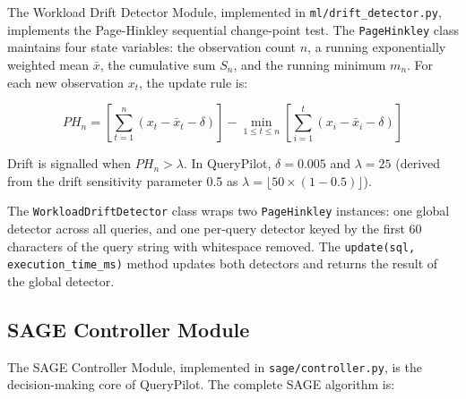 The Workload Drift Detector Module, implemented in
\texttt{ml/drift\_detector.py}, implements the Page-Hinkley sequential
change-point test. The \texttt{PageHinkley} class maintains four state
variables: the observation count $n$, a running exponentially weighted mean
$\bar{x}$, the cumulative sum $S_n$, and the running minimum $m_n$. For each
new observation $x_t$, the update rule is:

\begin{equation}
  PH_n = \left[\sum_{t=1}^{n}(x_t - \bar{x}_t - \delta)\right] -
         \min_{1 \le t \le n}\left[\sum_{i=1}^{t}(x_i - \bar{x}_i - \delta)\right]
  \label{eq:pagehinkley}
\end{equation}

Drift is signalled when $PH_n > \lambda$. In QueryPilot, $\delta = 0.005$ and
$\lambda = 25$ (derived from the drift sensitivity parameter 0.5 as
$\lambda = \lfloor 50 \times (1 - 0.5) \rfloor$).

The \texttt{WorkloadDriftDetector} class wraps two \texttt{PageHinkley}
instances: one global detector across all queries, and one per-query detector
keyed by the first 60 characters of the query string with whitespace removed.
The \texttt{update(sql, execution\_time\_ms)} method updates both detectors
and returns the result of the global detector.

\subsection{SAGE Controller Module}
\label{subsec:sage_controller}

The SAGE Controller Module, implemented in \texttt{sage/controller.py}, is the
decision-making core of QueryPilot. The complete SAGE algorithm is:

